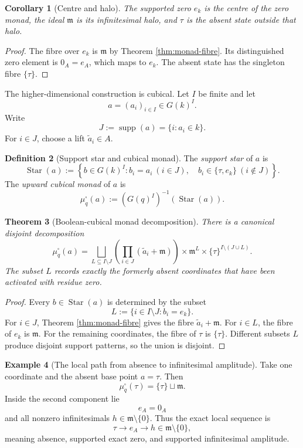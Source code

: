 \documentclass[11pt]{amsart}
\numberwithin{equation}{section}
\newtheorem{theorem}{Theorem}[section]
\newtheorem{corollary}[theorem]{Corollary}
\theoremstyle{definition}
\newtheorem{definition}[theorem]{Definition}
\newtheorem{example}[theorem]{Example}
\newcommand{\supp}{\operatorname{supp}}
\begin{document}
\begin{corollary}[Centre and halo]\label{cor:centre-and-halo}
The supported zero $e_k$ is the centre of the zero monad, the ideal $\mathfrak m$ is its infinitesimal halo, and $\tau$ is the absent state outside that halo.
\end{corollary}

\begin{proof}
The fibre over $e_k$ is $\mathfrak m$ by Theorem \ref{thm:monad-fibre}.  Its distinguished zero element is $0_A=e_A$, which maps to $e_k$.  The absent state has the singleton fibre $\{\tau\}$.
\end{proof}

The higher-dimensional construction is cubical.  Let $I$ be finite and let
\[
a=(a_i)_{i\in I}\in G(k)^I.
\]
Write
\[
J:=\supp(a)=\{i:a_i\in k\}.
\]
For $i\in J$, choose a lift $\widetilde a_i\in A$.

\begin{definition}[Support star and cubical monad]\label{def:cubical-monad}
The \emph{support star} of $a$ is
\[
\operatorname{Star}(a)
:=
\left\{
 b\in G(k)^I:
 b_i=a_i\ (i\in J),
\quad
b_i\in\{\tau,e_k\}\ (i\notin J)
\right\}.
\]
The \emph{upward cubical monad} of $a$ is
\[
\mu_q^\square(a)
:=
(G(q)^I)^{-1}(\operatorname{Star}(a)).
\]
\end{definition}

\begin{theorem}[Boolean-cubical monad decomposition]\label{thm:cubical-monad}
There is a canonical disjoint decomposition
\[
\boxed{
\mu_q^\square(a)
=
\bigsqcup_{L\subseteq I\setminus J}
\left(
\prod_{i\in J}(\widetilde a_i+\mathfrak m)
\right)
\times
\mathfrak m^L
\times
\{\tau\}^{I\setminus(J\cup L)}.}
\]
The subset $L$ records exactly the formerly absent coordinates that have been activated with residue zero.
\end{theorem}

\begin{proof}
Every $b\in\operatorname{Star}(a)$ is determined by the subset
\[
L:=\{i\in I\setminus J:b_i=e_k\}.
\]
For $i\in J$, Theorem \ref{thm:monad-fibre} gives the fibre $\widetilde a_i+\mathfrak m$.  For $i\in L$, the fibre of $e_k$ is $\mathfrak m$.  For the remaining coordinates, the fibre of $\tau$ is $\{\tau\}$.  Different subsets $L$ produce disjoint support patterns, so the union is disjoint.
\end{proof}

\begin{example}[The local path from absence to infinitesimal amplitude]
Take one coordinate and the absent base point $a=\tau$.  Then
\[
\mu_q^\square(\tau)
=
\{\tau\}\sqcup\mathfrak m.
\]
Inside the second component lie
\[
e_A=0_A
\]
and all nonzero infinitesimals $h\in\mathfrak m\setminus\{0\}$.  Thus the exact local sequence is
\[
\tau
\longrightarrow
 e_A
\longrightarrow
 h\in\mathfrak m\setminus\{0\},
\]
meaning absence, supported exact zero, and supported infinitesimal amplitude.
\end{example}
\end{document}
